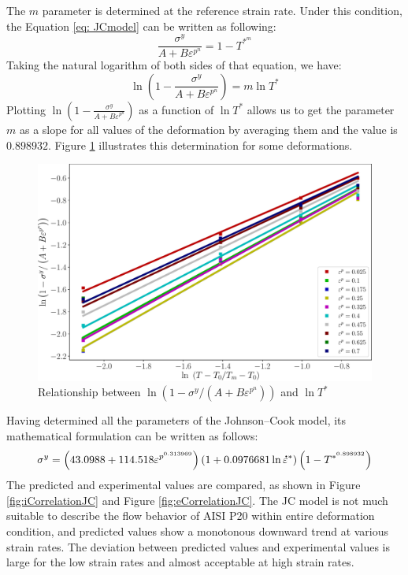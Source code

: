 \documentclass[twoside,english,1p,final,sort&compress]{elsarticle}
\theoremstyle{plain}
\newcommand{\mdot}[1]{\accentset{\mbox{\bfseries .}}{#1}}
\begin{document}
The $m$ parameter is determined at the reference strain rate. Under this condition, the Equation \ref{eq: JCmodel} can be written as following:
\begin{equation}
\frac{\sigma^y}{A + B\varepsilon^{p^n}} = 1 - T^{*^m}
\end{equation}
Taking the natural logarithm of both sides of that equation, we have:
\begin{equation}
\ln\left(1 - \frac{\sigma^y}{A + B\varepsilon^{p^n}}\right)  = m\ln T^*
\end{equation}
Plotting $\ln\left(1 - \frac{\sigma^y}{A + B\varepsilon^{p^n}}\right)$ as a function of $\ln T^*$ allows us to get the parameter $m$ as a slope for all values of the deformation by averaging them and the value is $0.898932$. Figure \ref{fig:JCSigmaT} illustrates this determination for some deformations.
\begin{figure}[!ht]
\centering
\includegraphics[width=0.85\columnwidth]
{newFigures/JCSigmaT}
\caption{Relationship between $\ln\left(1 - \sigma^y/\left(A + B\varepsilon^{p^n}\right)\right)$ and $\ln T^*$}
\label{fig:JCSigmaT}
\end{figure}
Having determined all the parameters of the Johnson--Cook model, its mathematical formulation can be written as follows:
\begin{equation}
\label{eq: JCmodelf}
\sigma^y = \left(43.0988 + 114.518\varepsilon^{p^{0.313969}}\right)\left(1+0.0976681\ln\mdot{\varepsilon}^*\right)\left(1-T^{*^{0.898932}}\right)
\end{equation}
The predicted and experimental values are compared, as shown in Figure \ref{fig:iCorrelationJC} and Figure  \ref{fig:eCorrelationJC}. The JC model is not much suitable to describe the ﬂow behavior of AISI P20 within entire deformation condition, and predicted values show a monotonous downward trend at various strain rates. The deviation between predicted values and experimental values is large for the low strain rates and almost acceptable at high strain rates.
\end{document}
